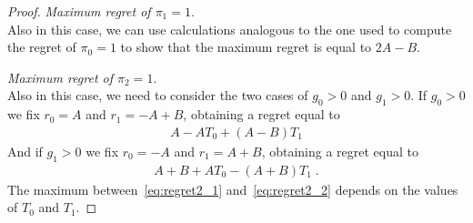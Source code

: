 \begin{proof}
\textit{Maximum regret of $\pi_1=1$}.\\
Also in this case, we can use calculations analogous to the one used to compute the regret of $\pi_0=1$ to show that the maximum regret is equal to $2A-B$.

\textit{Maximum regret of $\pi_2=1$}.\\
Also in this case, we need to consider the two cases of $g_0 > 0$ and $g_1 > 0$. If $g_0 > 0$ we fix $r_0 = A$ and $r_1 = -A+B$, obtaining a regret equal to 
\begin{align}
A- A T_0 +(A-B) T_1 \label{eq:regret2_1}
\end{align}
And if $g_1 > 0$ we fix $r_0 = -A$ and $r_1 = A+B$, obtaining a regret equal to 
\begin{align}
A+B+A T_0 -(A+B) T_1\;. \label{eq:regret2_2}
\end{align}
The maximum between~\eqref{eq:regret2_1} and~\eqref{eq:regret2_2} depends on the values of $T_0$ and $T_1$.

\end{proof}


